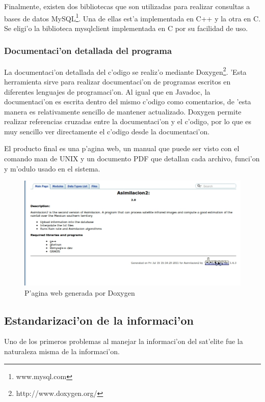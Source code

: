   Finalmente, existen dos bibliotecas que son utilizadas para realizar consultas
  a bases de datos MySQL\footnote{www.mysql.com}. Una de ellas est'a implementada en C++ y la otra en C.
  Se eligi'o la biblioteca mysqlclient implementada en C por su facilidad de uso.

  \subsubsection*{Documentaci'on detallada del programa}
  La documentaci'on detallada del c'odigo se realiz'o mediante Doxygen\footnote{http://www.doxygen.org/}. 
'Esta herramienta sirve para realizar documentaci'on de programas escritos
en diferentes lenguajes de programaci'on. Al igual que en Javadoc, la documentaci'on es escrita dentro del mismo c'odigo como comentarios, de 'esta manera 
es relativamente sencillo de mantener actualizado. Doxygen permite realizar referencias cruzadas entre la documentaci'on y el c'odigo, por lo que es muy 
sencillo ver directamente el c'odigo desde la documentaci'on.

  El producto final es una p'agina web, un manual 
  que puede ser visto con el comando man de UNIX y un documento PDF que detallan cada archivo, funci'on y m'odulo usado en el sistema.
\begin{figure}[h!]
 \centering
 \includegraphics[width=150mm]{./imagenes/doxygen1.jpg}
\caption{P'agina web generada por Doxygen}
\end{figure}

\subsection{Estandarizaci'on de la informaci'on}
  Uno de los primeros problemas al manejar la informaci'on del sat'elite fue la naturaleza misma de la informaci'on. 

